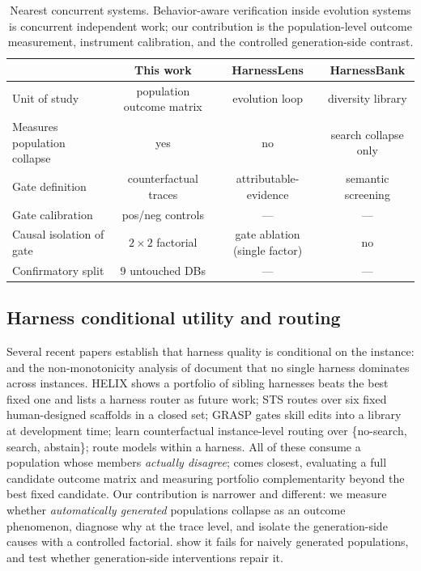\begin{table}[t]
\centering
\small
\begin{tabular}{@{}lccc@{}}
\toprule
 & \textbf{This work} & \textbf{HarnessLens} & \textbf{HarnessBank} \\
\midrule
Unit of study & population outcome matrix & evolution loop & diversity library \\
Measures population collapse & yes & no & search collapse only \\
Gate definition & counterfactual traces & attributable-evidence & semantic screening \\
Gate calibration & pos/neg controls & --- & --- \\
Causal isolation of gate & $2{\times}2$ factorial & gate ablation (single factor) & no \\
Confirmatory split & 9 untouched DBs & --- & --- \\
\bottomrule
\end{tabular}
\caption{Nearest concurrent systems. Behavior-aware verification inside
evolution systems is concurrent independent work; our contribution is the
population-level outcome measurement, instrument calibration, and the
controlled generation-side contrast.}
\label{tab:nearest}
\end{table}

\subsection{Harness conditional utility and routing}\label{related:routing}
Several recent papers establish that harness quality is conditional on the
instance: \citet{nouniversal2026} and the non-monotonicity analysis of
\citet{nonmonotone2026} document that no single harness dominates across
instances. HELIX \citep{helix2026} shows a portfolio of sibling harnesses
beats the best fixed one and lists a harness router as future work; STS
\citep{sts2026} routes over six fixed human-designed scaffolds in a closed
set; GRASP \citep{grasp2026} gates skill edits into a library at development
time; \citet{cfrouting2026} learn counterfactual instance-level routing over
\{no-search, search, abstain\}; \citet{agenticrouting2026} route models
within a harness. All of these consume a population whose members
\emph{actually disagree}; \citet{helix2026} comes closest, evaluating a
full candidate outcome matrix and measuring portfolio complementarity beyond
the best fixed candidate. Our contribution is narrower and different: we
measure whether \emph{automatically generated} populations collapse as an
outcome phenomenon, diagnose why at the trace level, and isolate the
generation-side causes with a controlled factorial.
show it fails for naively generated populations, and test whether
generation-side interventions repair it.

